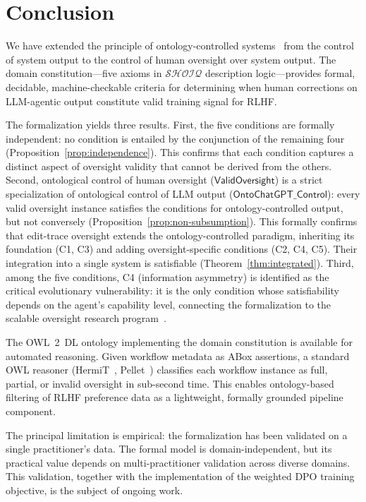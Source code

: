 \documentclass[11pt]{article}
\newcommand{\DL}{\ensuremath{\mathcal{SHOIQ}}\xspace}
\begin{document}
\section{Conclusion}
\label{sec:conclusion}

We have extended the principle of ontology-controlled systems~\citep{palagin2006architecture} from the control of system output to the control of human oversight over system output.
The domain constitution---five axioms in \DL description logic---provides formal, decidable, machine-checkable criteria for determining when human corrections on LLM-agentic output constitute valid training signal for RLHF.

The formalization yields three results.
First, the five conditions are formally independent: no condition is entailed by the conjunction of the remaining four (Proposition~\ref{prop:independence}).
This confirms that each condition captures a distinct aspect of oversight validity that cannot be derived from the others.
Second, ontological control of human oversight ($\mathsf{ValidOversight}$) is a strict specialization of ontological control of LLM output ($\mathsf{OntoChatGPT\_Control}$): every valid oversight instance satisfies the conditions for ontology-controlled output, but not conversely (Proposition~\ref{prop:non-subsumption}).
This formally confirms that edit-trace oversight extends the ontology-controlled paradigm, inheriting its foundation (C1, C3) and adding oversight-specific conditions (C2, C4, C5).
Their integration into a single system is satisfiable (Theorem~\ref{thm:integrated}).
Third, among the five conditions, C4 (information asymmetry) is identified as the critical evolutionary vulnerability: it is the only condition whose satisfiability depends on the agent's capability level, connecting the formalization to the scalable oversight research program~\citep{bowman2022measuring}.

The OWL~2~DL ontology implementing the domain constitution is available for automated reasoning.
Given workflow metadata as ABox assertions, a standard OWL reasoner (HermiT~\citep{glimm2014hermit}, Pellet~\citep{sirin2007pellet}) classifies each workflow instance as full, partial, or invalid oversight in sub-second time.
This enables ontology-based filtering of RLHF preference data as a lightweight, formally grounded pipeline component.

The principal limitation is empirical: the formalization has been validated on a single practitioner's data.
The formal model is domain-independent, but its practical value depends on multi-practitioner validation across diverse domains.
This validation, together with the implementation of the weighted DPO training objective, is the subject of ongoing work.




\end{document}
